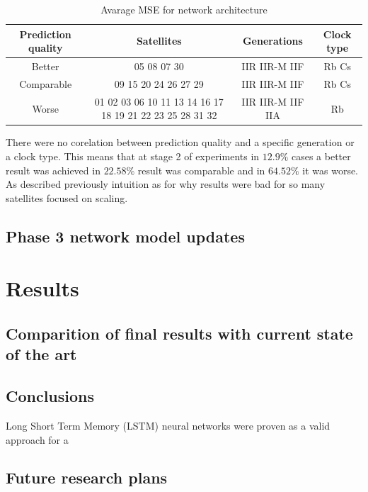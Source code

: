 \begin{table}[ht] 
	\centering
	\caption{Avarage MSE for network architecture}
	\label{tab:phase_2_groups}
	\begin{tabular}{cccc}
		\hline
		\hline
		Prediction quality& Satellites& Generations& Clock type  \\
		\hline
		Better& 05 08 07 30& IIR IIR-M IIF& Rb Cs\\
		Comparable& 09 15 20 24 26 27 29& IIR IIR-M IIF& Rb Cs\\
		Worse& 01 02 03 06 10 11 13 14 16 17 18 19 21 22 23 25 28 31 32& IIR IIR-M IIF IIA& Rb\\
		\hline
		\hline
	\end{tabular}
\end{table}
There were no corelation between  prediction quality and a specific generation or a clock type.
This means that at stage 2 of experiments in $12.9\%$ cases a better result was achieved in
$22.58\%$ result was comparable and in $64.52\%$ it was worse.
As described previously intuition as for why results were bad for so many satellites focused
on scaling.

\subsection{Phase 3 network model updates}


\section{Results}

\subsection{Comparition of final results with current state of the art}

\subsection{Conclusions}
Long Short Term Memory (LSTM) neural networks were proven as a valid approach for a 


\subsection{Future research plans}


